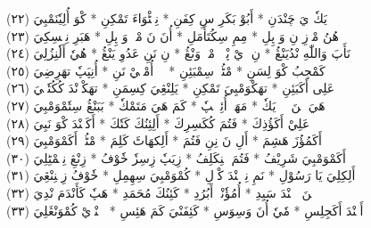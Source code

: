 \documentclass[a4paper, 10pt]{report}
\begin{document}
\begin{center}
\textarabic{(٢٢) \textcolor{mygreen}{پٖٹٖ يَكٗ يَ چَنْدَنِ  * أَبُوْ بَكَرِ سِ كِفَنِ  * نِمٖٹْوَاءَ تَمْكِنِ  * كْوَ أُلِيٗنَمْبِيَ }} 
\\[5mm] 

\textarabic{(٢٣) \textcolor{mygreen}{هُنُ مْوٖزِ نِ وَ پِلِ  * مِمِ سِكُتَأَمَلِ  * أُنَ نَ مْكٖ وَ پِلِ  * هَبَرِ نِمٖسِكِيَ }} 
\\[5mm] 

\textarabic{(٢٤) \textcolor{mygreen}{نَأَپَ وَاللّٰهِ نْدُيَنْڠُ  * نِ وٖيْ پْوٖكٖ مْكٖ وَنْڠُ  * نِ نَنِ عَدُوِ يَنْڠُ  * هُيٗ أَلٗنِزُلِيَ }} 
\\[5mm] 

\textarabic{(٢٥) \textcolor{mygreen}{كَمْجِبُ كْوَ لِسَنِ  * مْٹُيٖ سِمْبَئِنِ  * پٖٹٖ أُمْپٖيْ نَنِ  * أُنِپَپٗ تهَرِضِيَ }} 
\\[5mm] 

\textarabic{(٢٦) \textcolor{mygreen}{عَلِى أَكَبَئِنِ  * تهَكْوَمْبِيَ تَمْكِنِ  * يَلِنْڠِيَ كِسِمَنِ  * تهَكْوٖنْدَ كُكُتٗلٖيَ }} 
\\[5mm] 

\textarabic{(٢٧) \textcolor{mygreen}{هَيَ نٖنَ پٖٹٖ يَكٗ  * مَهَلٖ أُئِوٖسٖپٗ  * كَمَ هَيَ مَتَمْكٗ  * بَبَنْڠُ سِتٗمْوَمْبِيَ }} 
\\[5mm] 

\textarabic{(٢٨) \textcolor{mygreen}{عَلِيْ أَكَؤُذِكَ  * فَتُمَ كُكَسِرِكَ  * أَلِئِنُكَ كَتٗكَ  * أَكَنٖنْدَ كْوَ نَبِيَ }} 
\\[5mm] 

\textarabic{(٢٩) \textcolor{mygreen}{أَكَمُؤُزَ هَشِمَ  * أَلِ نَ نِنِ فَتُمَ  * أَلِكهَاٹَ كَلِمَ  * مْٹُمٖ أَكَمْوَمْبِيَ }} 
\\[5mm] 

\textarabic{(٣٠) \textcolor{mygreen}{أَكَمْوَمْبِيَ شَرِيْفُ  * فَتُمَ مٖنِكَلِفُ  * زِيَپٗ زِسِزٗ خٗوْفُ  * زِنْڠِ نِمٖمْٹِلِيَ }} 
\\[5mm] 

\textarabic{(٣١) \textcolor{mygreen}{أَلِكِلِيَ يَا رَسُوْلِ  * نَمِ نِمٖٹٖنْدَ كْوٖلِ  * كُمْوَمْبِيَ سِهِمِلِ  * خٗوْفُ زِمٖنِنْڠِيَ }} 
\\[5mm] 

\textarabic{(٣٢) \textcolor{mygreen}{تٖنَ إٖنٖنْدَ سَيِدِ  * أُمُؤٗنْيٖ أَبُرُدِ  * كَئِنُكَ مُحَمَدِ  * هَپٗ كَأَنْدَمَ نْدِيَ }} 
\\[5mm] 

\textarabic{(٣٣) \textcolor{mygreen}{أَكٖنْدَ أَكَجِلِسِ  * مٗيٗ أُنَ وَسِوَسِ  * كَئِفَنْيَ كَمَ هَئِسِ  * إٖنٖنْدٖيْ كُمْوَنْڠَلِيَ }} 
\\[5mm] 


\end{center}
\end{document}
